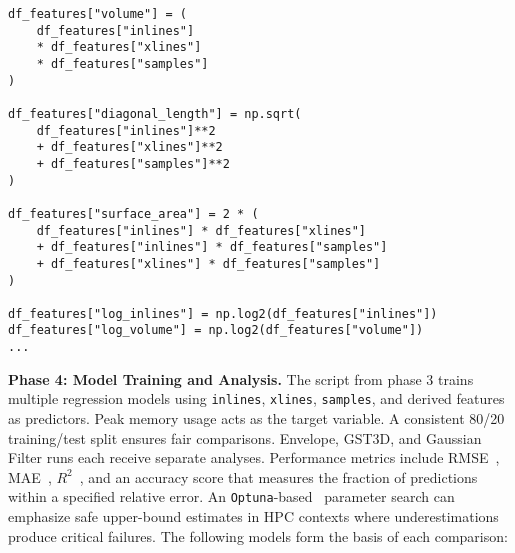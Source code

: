 \begin{lstlisting}[style=pythonstyle,
    caption={Feature extraction excerpt from \texttt{collect\_results.py}~\cite{delucca2025experiment2resultscollection}. Additional derived metrics capture polynomial or ratio-based growth.},
    label={lst:results_py}]
df_features["volume"] = (
    df_features["inlines"]
    * df_features["xlines"]
    * df_features["samples"]
)

df_features["diagonal_length"] = np.sqrt(
    df_features["inlines"]**2
    + df_features["xlines"]**2
    + df_features["samples"]**2
)

df_features["surface_area"] = 2 * (
    df_features["inlines"] * df_features["xlines"]
    + df_features["inlines"] * df_features["samples"]
    + df_features["xlines"] * df_features["samples"]
)

df_features["log_inlines"] = np.log2(df_features["inlines"])
df_features["log_volume"] = np.log2(df_features["volume"])
...
\end{lstlisting}

\vspace{1em}
\noindent
\textbf{Phase 4: Model Training and Analysis.}
The script from phase 3 trains multiple regression models using \texttt{inlines}, \texttt{xlines}, \texttt{samples}, and derived features as predictors.
Peak memory usage acts as the target variable.
A consistent 80/20 training/test split ensures fair comparisons.
Envelope, \ac{GST3D}, and Gaussian Filter runs each receive separate analyses.
Performance metrics include \ac{RMSE}~\cite{hyndman2006}, \ac{MAE}~\cite{willmott2005mae}, $R^2$~\cite{draper1998applied}, and an accuracy score that measures the fraction of predictions within a specified relative error.
An \texttt{Optuna}-based~\cite{akiba2019optuna} parameter search can emphasize safe upper-bound estimates in \ac{HPC} contexts where underestimations produce critical failures.
The following models form the basis of each comparison:

